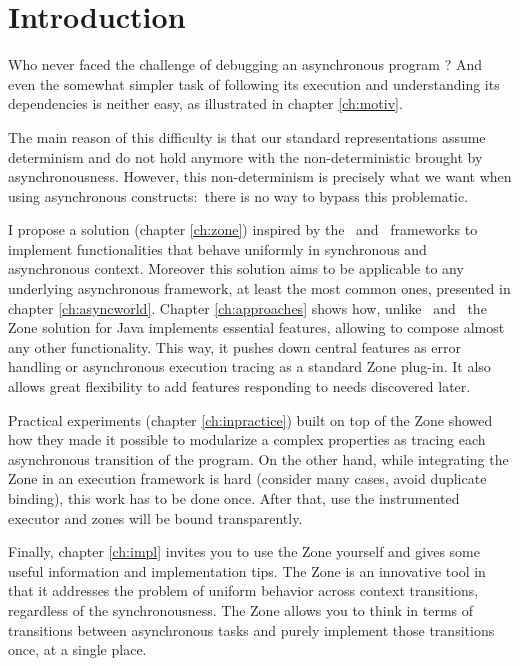 
\chapter{Introduction}
\label{ch:intro}

Who never faced the challenge of debugging an asynchronous program ? And even the somewhat simpler task of following its execution and understanding its dependencies is neither easy, as illustrated in chapter \ref{ch:motiv}.

The main reason of this difficulty is that our standard representations assume determinism and do not hold anymore with the non-deterministic brought by asynchronousness.
However, this non-determinism is precisely what we want when using asynchronous constructs:~there is no way to bypass this problematic.

I propose a solution (chapter \ref{ch:zone}) inspired by the \zonejs\ and \zonedrt\ frameworks to implement functionalities that behave uniformly in synchronous and asynchronous context. Moreover this solution aims to be applicable to any underlying asynchronous framework, at least the most common ones, presented in chapter \ref{ch:asyncworld}. Chapter \ref{ch:approaches} shows how, unlike \zonejs\ and \zonedrt\ the Zone solution for Java implements essential features, allowing to compose almost any other functionality. This way, it pushes down central features as error handling or asynchronous execution tracing as a standard Zone plug-in. It also allows great flexibility to add features responding to needs discovered later.

Practical experiments (chapter \ref{ch:inpractice}) built on top of the Zone showed how they made it possible to modularize a complex properties as tracing each asynchronous transition of the program. On the other hand, while integrating the Zone in an execution framework is hard (consider many cases, avoid duplicate binding), this work has to be done once. After that, use the instrumented executor and zones will be bound transparently.

Finally, chapter \ref{ch:impl} invites you to use the Zone yourself and gives some useful information and implementation tips. The Zone is an innovative tool in that it addresses the problem of uniform behavior across context transitions, regardless of the synchronousness. The Zone allows you to think in terms of transitions between asynchronous tasks and purely implement those transitions once, at a single place.









